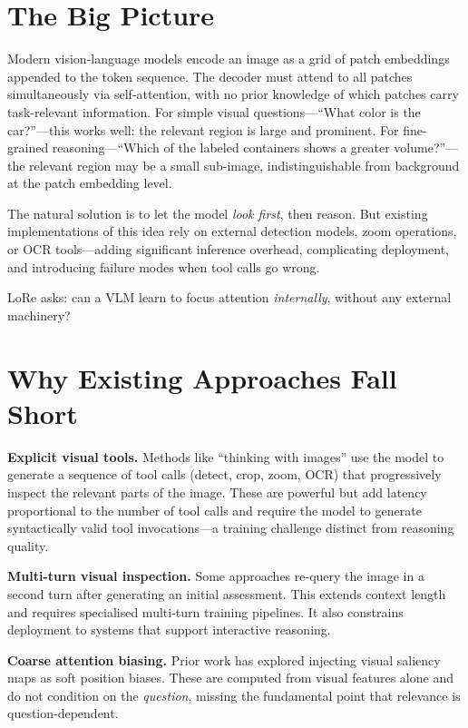 \documentclass[10pt,twocolumn]{article}
\begin{document}
\section{The Big Picture}

Modern vision-language models encode an image as a grid of patch embeddings appended to the token sequence.
The decoder must attend to all patches simultaneously via self-attention, with no prior knowledge of which patches carry task-relevant information.
For simple visual questions---``What color is the car?''---this works well: the relevant region is large and prominent.
For fine-grained reasoning---``Which of the labeled containers shows a greater volume?''---the relevant region may be a small sub-image, indistinguishable from background at the patch embedding level.

The natural solution is to let the model \emph{look first}, then reason.
But existing implementations of this idea rely on external detection models, zoom operations, or OCR tools---adding significant inference overhead, complicating deployment, and introducing failure modes when tool calls go wrong.

LoRe asks: can a VLM learn to focus attention \emph{internally}, without any external machinery?

\section{Why Existing Approaches Fall Short}

\textbf{Explicit visual tools.}
Methods like ``thinking with images'' use the model to generate a sequence of tool calls (detect, crop, zoom, OCR) that progressively inspect the relevant parts of the image.
These are powerful but add latency proportional to the number of tool calls and require the model to generate syntactically valid tool invocations---a training challenge distinct from reasoning quality.

\textbf{Multi-turn visual inspection.}
Some approaches re-query the image in a second turn after generating an initial assessment.
This extends context length and requires specialised multi-turn training pipelines.
It also constrains deployment to systems that support interactive reasoning.

\textbf{Coarse attention biasing.}
Prior work has explored injecting visual saliency maps as soft position biases.
These are computed from visual features alone and do not condition on the \emph{question}, missing the fundamental point that relevance is question-dependent.
\end{document}
